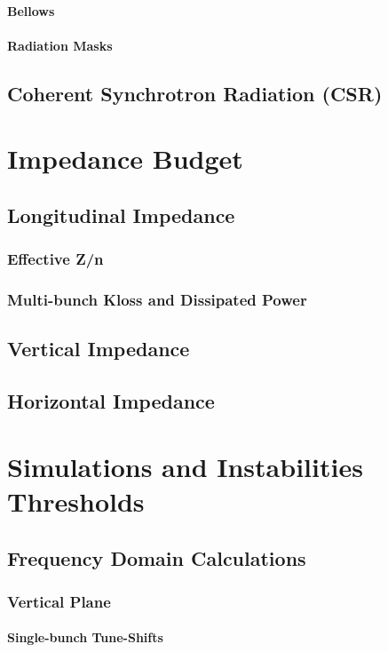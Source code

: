\documentclass[
	12pt,				%
	openright,			%
	oneside,			%
	a4paper,		%
	chapter=TITLE,		%
	section=TITLE,		%
    brazil,				%
	english,			%
	sumario=tradicional,
	]{abntex2}
\begin{document}
        \paragraph{Bellows}
        \paragraph{Radiation Masks}
    \subsection{Coherent Synchrotron Radiation (CSR)}
  \section{Impedance Budget}
    \subsection{Longitudinal Impedance}
      \subsubsection{Effective Z/n}
      \subsubsection{Multi-bunch Kloss and Dissipated Power}
    \subsection{Vertical Impedance}
    \subsection{Horizontal Impedance}
  \section{Simulations and Instabilities Thresholds}
    \subsection{Frequency Domain Calculations}
      \subsubsection{Vertical Plane}
        \paragraph{Single-bunch Tune-Shifts}
\end{document}
